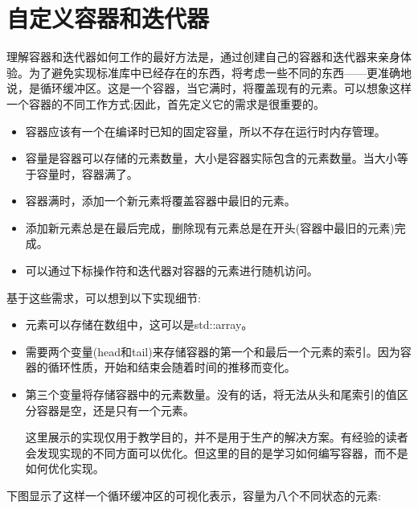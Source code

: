 \section{自定义容器和迭代器}

理解容器和迭代器如何工作的最好方法是，通过创建自己的容器和迭代器来亲身体验。为了避免实现标准库中已经存在的东西，将考虑一些不同的东西——更准确地说，是循环缓冲区。这是一个容器，当它满时，将覆盖现有的元素。可以想象这样一个容器的不同工作方式;因此，首先定义它的需求是很重要的。

\begin{itemize}
\item
容器应该有一个在编译时已知的固定容量，所以不存在运行时内存管理。

\item
容量是容器可以存储的元素数量，大小是容器实际包含的元素数量。当大小等于容量时，容器满了。

\item
容器满时，添加一个新元素将覆盖容器中最旧的元素。

\item
添加新元素总是在最后完成，删除现有元素总是在开头(容器中最旧的元素)完成。

\item
可以通过下标操作符和迭代器对容器的元素进行随机访问。
\end{itemize}

基于这些需求，可以想到以下实现细节:

\begin{itemize}
\item
元素可以存储在数组中，这可以是std::array。

\item
需要两个变量(head和tail)来存储容器的第一个和最后一个元素的索引。因为容器的循环性质，开始和结束会随着时间的推移而变化。

\item
第三个变量将存储容器中的元素数量。没有的话，将无法从头和尾索引的值区分容器是空，还是只有一个元素。

\begin{important}
这里展示的实现仅用于教学目的，并不是用于生产的解决方案。有经验的读者会发现实现的不同方面可以优化。但这里的目的是学习如何编写容器，而不是如何优化实现。
\end{important}

\end{itemize}

下图显示了这样一个循环缓冲区的可视化表示，容量为八个不同状态的元素:

